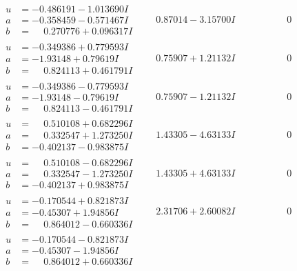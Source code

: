 \documentclass[1p]{elsarticle_modified}
\theoremstyle{definition}
\begin{document}
$$\begin{array}{c|c|c}
\begin{aligned}
u &= -0.486191 - 1.013690 I \\
a &= -0.358459 - 0.571467 I \\
b &= \phantom{-}0.270776 + 0.096317 I\end{aligned}
 & \phantom{-}0.87014 - 3.15700 I & \phantom{-0.000000 } 0 \\ \hline\begin{aligned}
u &= -0.349386 + 0.779593 I \\
a &= -1.93148 + 0.79619 I \\
b &= \phantom{-}0.824113 + 0.461791 I\end{aligned}
 & \phantom{-}0.75907 + 1.21132 I & \phantom{-0.000000 } 0 \\ \hline\begin{aligned}
u &= -0.349386 - 0.779593 I \\
a &= -1.93148 - 0.79619 I \\
b &= \phantom{-}0.824113 - 0.461791 I\end{aligned}
 & \phantom{-}0.75907 - 1.21132 I & \phantom{-0.000000 } 0 \\ \hline\begin{aligned}
u &= \phantom{-}0.510108 + 0.682296 I \\
a &= \phantom{-}0.332547 + 1.273250 I \\
b &= -0.402137 - 0.983875 I\end{aligned}
 & \phantom{-}1.43305 - 4.63133 I & \phantom{-0.000000 } 0 \\ \hline\begin{aligned}
u &= \phantom{-}0.510108 - 0.682296 I \\
a &= \phantom{-}0.332547 - 1.273250 I \\
b &= -0.402137 + 0.983875 I\end{aligned}
 & \phantom{-}1.43305 + 4.63133 I & \phantom{-0.000000 } 0 \\ \hline\begin{aligned}
u &= -0.170544 + 0.821873 I \\
a &= -0.45307 + 1.94856 I \\
b &= \phantom{-}0.864012 - 0.660336 I\end{aligned}
 & \phantom{-}2.31706 + 2.60082 I & \phantom{-0.000000 } 0 \\ \hline\begin{aligned}
u &= -0.170544 - 0.821873 I \\
a &= -0.45307 - 1.94856 I \\
b &= \phantom{-}0.864012 + 0.660336 I\end{aligned}

\end{array}$$
\end{document}
